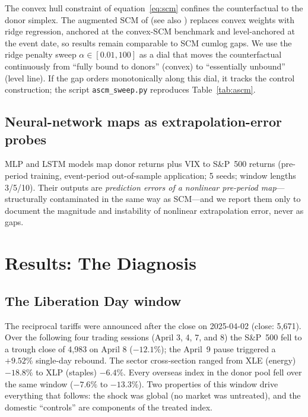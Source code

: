 \documentclass[11pt,a4paper]{article}
\begin{document}
The convex hull constraint of equation~\eqref{eq:scm} confines the
counterfactual to the donor simplex. The augmented SCM of
\citet{benmichael2021} (see also \citealp{doudchenko2016}) replaces convex
weights with ridge regression, anchored at the convex-SCM benchmark and
level-anchored at the event date, so results remain comparable to SCM cumlog
gaps. We use the ridge penalty sweep $\alpha\in[0.01,100]$ as a dial that
moves the counterfactual continuously from ``fully bound to donors''
(convex) to ``essentially unbound'' (level line). If the gap orders
monotonically along this dial, it tracks the control construction; the
script \texttt{ascm\_sweep.py} reproduces Table~\ref{tab:ascm}.

\subsection{Neural-network maps as extrapolation-error probes}

MLP and LSTM models map donor returns plus VIX to S\&P~500 returns
(pre-period training, event-period out-of-sample application; 5 seeds;
window lengths 3/5/10). Their outputs are \emph{prediction errors of a
nonlinear pre-period map}---structurally contaminated in the same way as
SCM---and we report them only to document the magnitude and instability of
nonlinear extrapolation error, never as gaps.

\section{Results: The Diagnosis}\label{sec:results}

\subsection{The Liberation Day window}\label{sec:narrative}

The reciprocal tariffs were announced after the close on 2025-04-02
(close: 5{,}671). Over the following four trading sessions (April 3, 4, 7,
and 8) the S\&P~500 fell to a trough close of 4{,}983 on April 8
($-12.1\%$); the April~9 pause triggered a
$+9.52\%$ single-day rebound. The sector cross-section ranged from XLE
(energy) $-18.8\%$ to XLP (staples) $-6.4\%$. Every overseas index in the
donor pool fell over the same window ($-7.6\%$ to $-13.3\%$). Two
properties of this window drive everything that follows: the shock was
global (no market was untreated), and the domestic ``controls'' are
components of the treated index.
\end{document}

